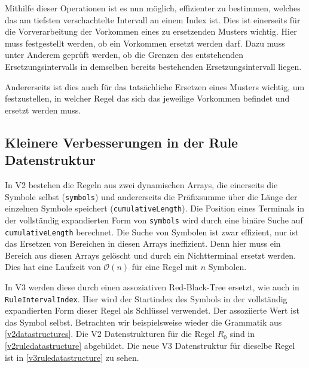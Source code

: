 Mithilfe dieser Operationen ist es nun möglich, effizienter zu bestimmen, welches das am tiefsten verschachtelte Intervall an einem Index ist. Dies ist einerseits für die Vorverarbeitung der Vorkommen eines zu ersetzenden Musters wichtig. Hier muss festgestellt werden, ob ein Vorkommen ersetzt werden darf. Dazu muss unter Anderem geprüft werden, ob die Grenzen des entstehenden Ersetzungsintervalls in demselben bereits bestehenden Ersetzungsintervall liegen. 

Andererseits ist dies auch für das tatsächliche Ersetzen eines Musters wichtig, um festzustellen, in welcher Regel das sich das jeweilige Vorkommen befindet und ersetzt werden muss.

\subsection{Kleinere Verbesserungen in der Rule Datenstruktur}

In V2 bestehen die Regeln aus zwei dynamischen Arrays, die einerseits die Symbole selbst (\texttt{symbols}) und andererseits die Präfixsumme über die Länge der einzelnen Symbole speichert (\texttt{cumulativeLength}).
Die Position eines Terminals in der vollständig expandierten Form von \texttt{symbols} wird durch eine binäre Suche auf \texttt{cumulativeLength} berechnet. Die Suche von Symbolen ist zwar effizient, nur ist das Ersetzen von Bereichen in diesen Arrays ineffizient. Denn hier muss ein Bereich aus diesen Arrays gelöscht und durch ein Nichtterminal ersetzt werden. Dies hat eine Laufzeit von $\mathcal{O}(n)$ für eine Regel mit $n$ Symbolen.

In V3 werden diese durch einen assoziativen Red-Black-Tree ersetzt, wie auch in \texttt{RuleIntervalIndex}. Hier wird der Startindex des Symbols in der vollständig expandierten Form dieser Regel als Schlüssel verwendet. Der assoziierte Wert ist das Symbol selbst. Betrachten wir beispielsweise wieder die Grammatik aus \autoref{v2datastructures}.
Die V2 Datenstrukturen für die Regel $R_0$ sind in \autoref{v2ruledatastructure} abgebildet. Die neue V3 Datenstruktur für dieselbe Regel ist in \autoref{v3ruledatastructure} zu sehen.

